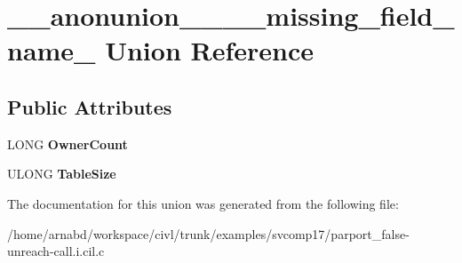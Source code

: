 \hypertarget{union____anonunion________missing__field__name__38}{}\section{\+\_\+\+\_\+anonunion\+\_\+\+\_\+\+\_\+\+\_\+missing\+\_\+field\+\_\+name\+\_ Union Reference}
\label{union____anonunion________missing__field__name__38}
\subsection*{Public Attributes}
\begin{DoxyCompactItemize}
\item 
\hypertarget{union____anonunion________missing__field__name__38_a5c81f0e36ee1a292f5e96fc970f089da}{}L\+O\+N\+G {\bfseries Owner\+Count}\label{union____anonunion________missing__field__name__38_a5c81f0e36ee1a292f5e96fc970f089da}

\item 
\hypertarget{union____anonunion________missing__field__name__38_a48383290aa38f2e72a0acbab2b253550}{}U\+L\+O\+N\+G {\bfseries Table\+Size}\label{union____anonunion________missing__field__name__38_a48383290aa38f2e72a0acbab2b253550}

\end{DoxyCompactItemize}


The documentation for this union was generated from the following file\+:\begin{DoxyCompactItemize}
\item 
/home/arnabd/workspace/civl/trunk/examples/svcomp17/parport\+\_\+false-\/unreach-\/call.\+i.\+cil.\+c\end{DoxyCompactItemize}
